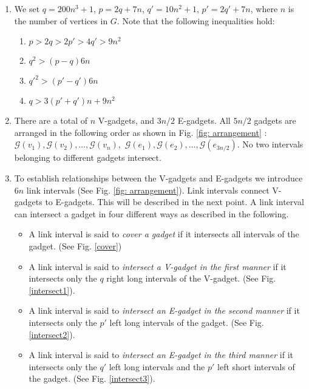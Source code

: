 \documentclass[11pt]{article}
\begin{document}
\begin{enumerate}
\item
 We set $q = 200n^3 + 1$, $p=2q+7n$, $q' = 10n^2 + 1$, $p' = 2q'+7n$, where $n$ is the number of vertices in $G$. Note that the following inequalities hold:
 \begin{enumerate} 
  \item $p>2q>2p'>4q'> 9n^2$
  \item $q^2>(p-q)6n$
  \item $q'^2>(p'-q')6n$
  \item $q > 3(p' + q')n + 9n^2$
 

  \end {enumerate}
 
 
\item There are a total of $n$ V-gadgets, and $3n/2$ E-gadgets. 
All $5n/2$ gadgets are arranged in the following order as shown in Fig. \ref{fig: arrangement} : $\mathcal{G}(v_1), \mathcal{G}(v_2), \ldots, \mathcal{G}(v_n),$ $\mathcal{G}(e_1), \mathcal{G}(e_2), \ldots, \mathcal{G}(e_{3n/2})$. No two intervals belonging to different gadgets intersect. 
 
 
 \item To establish relationships between the V-gadgets and E-gadgets we introduce $6n$ link intervals (See Fig. \ref{fig: arrangement}). Link intervals connect V-gadgets to E-gadgets. This will be described in the next point. A link interval can intersect a gadget in four different ways as described in the following.
 
 \begin{itemize}
  \item A link interval is said to \emph{cover a gadget} if it intersects all intervals of the gadget. (See Fig. \ref{cover})
  
  \item A link interval is said to \emph{intersect a V-gadget in the first manner} if it intersects only the $q$ right long intervals of the V-gadget. (See Fig. \ref{intersect1}). 
  
  \item A link interval is said to \emph{intersect an E-gadget in the second manner} if it intersects only the $p'$ left long intervals of the gadget. (See Fig. \ref{intersect2}). 
  
  \item A link interval is said to \emph{intersect an E-gadget in the third manner} if it intersects only the $q'$ left long intervals and the $p'$ left short intervals of the gadget. (See Fig. \ref{intersect3}). 
 \end{itemize}


\end{enumerate}
\end{document}
